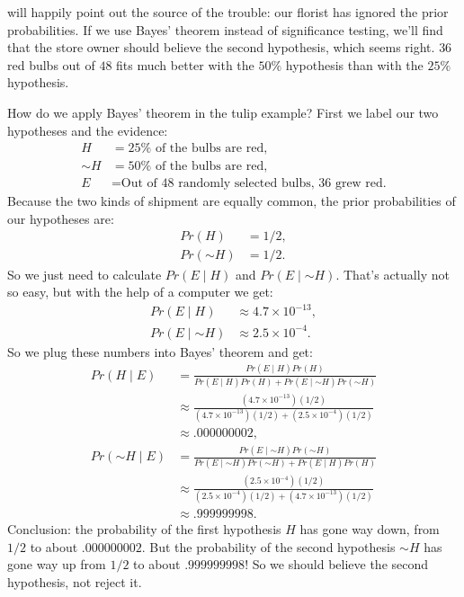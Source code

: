 \documentclass[justified]{tufte-book}
\newcommand{\given}{\mid}
\renewcommand{\neg}{\mathbin{\sim}}
\newcommand{\p}{Pr}
\theoremstyle{definition}
\theoremstyle{definition}
\theoremstyle{definition}
\theoremstyle{remark}
\begin{document}
 will happily point out the source of the trouble:
our florist has ignored the prior probabilities. If we use Bayes'
theorem instead of significance testing, we'll find that the store owner
should believe the second hypothesis, which seems right. \(36\) red
bulbs out of \(48\) fits much better with the \(50\%\) hypothesis than
with the \(25\%\) hypothesis.

How do we apply Bayes' theorem in the tulip example? First we label our
two hypotheses and the evidence: \[
  \begin{aligned}
    H      &= \mbox{$25\%$ of the bulbs are red},\\
    \neg H &= \mbox{$50\%$ of the bulbs are red,}\\
    E      &= \mbox{Out of 48 randomly selected bulbs, 36 grew red.}
  \end{aligned}
\] Because the two kinds of shipment are equally common, the prior
probabilities of our hypotheses are: \[
  \begin{aligned}
    \p(H) &= 1/2,\\
    \p(\neg H) &= 1/2.
  \end{aligned}
\] So we just need to calculate \(\p(E \given H)\) and
\(\p(E \given \neg H)\). That's actually not so easy, but with the help
of a computer we get: \[
  \begin{aligned}
    \p(E \given H) &\approx 4.7 \times 10^{-13},\\
    \p(E \given \neg H) &\approx 2.5 \times 10^{-4}.
  \end{aligned}
\] So we plug these numbers into Bayes' theorem and get: \[
  \begin{aligned}
    \p(H \given E) &= \frac{\p(E \given H)\p(H)}{\p(E \given H)\p(H) + \p(E \given \neg H)\p(\neg H)}\\
        &\approx \frac{(4.7 \times 10^{-13})(1/2)}{(4.7 \times 10^{-13})(1/2) + (2.5 \times 10^{-4})(1/2)}\\
        &\approx .000000002,\\
    \p(\neg H \given E) &= \frac{\p(E \given \neg H)\p(\neg H)}{\p(E \given \neg H)\p(\neg H) + \p(E \given H)\p(H)}\\
        &\approx \frac{(2.5 \times 10^{-4})(1/2)}{(2.5 \times 10^{-4})(1/2) + (4.7 \times 10^{-13})(1/2)}\\
        &\approx .999999998.
  \end{aligned}
\] Conclusion: the probability of the first hypothesis \(H\) has gone
way down, from \(1/2\) to about \(.000000002\). But the probability of
the second hypothesis \(\neg H\) has gone way up from \(1/2\) to about
\(.999999998\)! So we should believe the second hypothesis, not reject
it.
\end{document}
